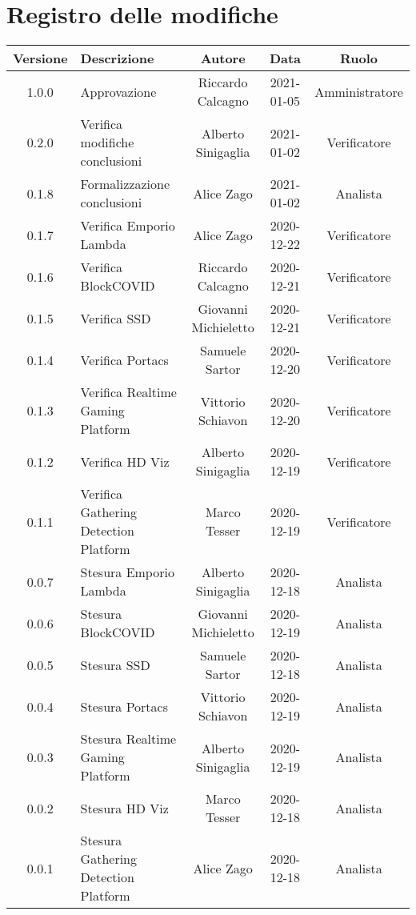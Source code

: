\section*{Registro delle modifiche}

\begin{center}
	\begin{longtable}{|c|p{4cm}|c|c|c|}
	\hline
	\rowcolor{lighter-grayer}
	\textbf{Versione} & \textbf{Descrizione} & \textbf{Autore} & \textbf{Data} & \textbf{Ruolo} \\
	\hline
	\endfirsthead
	
	1.0.0 & Approvazione & Riccardo Calcagno & 2021-01-05 & Amministratore\\
	\hline
	0.2.0 & Verifica modifiche conclusioni & Alberto Sinigaglia & 2021-01-02 & Verificatore\\
	\hline
	0.1.8 & Formalizzazione conclusioni & Alice Zago & 2021-01-02 & Analista\\
	\hline
	0.1.7 & Verifica Emporio Lambda & Alice Zago & 2020-12-22 & Verificatore\\
	\hline
	0.1.6 & Verifica BlockCOVID & Riccardo Calcagno & 2020-12-21 & Verificatore \\
	\hline
	0.1.5 & Verifica SSD & Giovanni Michieletto & 2020-12-21 & Verificatore \\
	\hline
	0.1.4 & Verifica Portacs & Samuele Sartor & 2020-12-20 & Verificatore \\
	\hline
	0.1.3 & Verifica Realtime Gaming Platform  & Vittorio Schiavon & 2020-12-20 & Verificatore \\
	\hline
	0.1.2 & Verifica HD Viz & Alberto Sinigaglia & 2020-12-19 & Verificatore \\
	\hline
	0.1.1 & Verifica Gathering Detection Platform & Marco Tesser  & 2020-12-19 & Verificatore\\
	\hline
	0.0.7 & Stesura Emporio Lambda & Alberto Sinigaglia & 2020-12-18 & Analista\\
	\hline
	0.0.6 & Stesura BlockCOVID & Giovanni Michieletto & 2020-12-19 & Analista \\
	\hline
	0.0.5 & Stesura SSD & Samuele Sartor & 2020-12-18 & Analista \\
	\hline
	0.0.4 & Stesura Portacs & Vittorio Schiavon & 2020-12-19 & Analista \\
	\hline
	0.0.3 & Stesura Realtime Gaming Platform  & Alberto Sinigaglia & 2020-12-19 & Analista \\
	\hline
	0.0.2 & Stesura HD Viz & Marco Tesser & 2020-12-18 & Analista \\
	\hline
	0.0.1 & Stesura Gathering Detection Platform & Alice Zago & 2020-12-18 & Analista\\
	\hline
	\end{longtable}
\end{center}